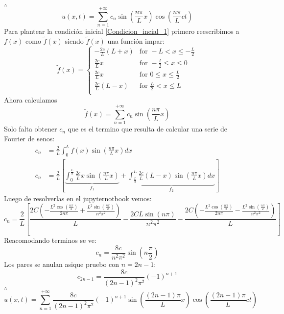 \documentclass{article}
\begin{document}
$\therefore$ 
\begin{equation*}
    u(x,t)=\sum_{n=1}^{+\infty}c_n\sin{\left(\frac{n\pi}{L}x\right)}\cos{\left(\frac{n\pi}{L}ct\right)}
\end{equation*}
Para plantear la condición inicial \eqref{Condicion_incial_1} primero reescribimos a $f(x)$ como $\widetilde{f}(x)$ siendo $\widetilde{f}(x)$ una función impar:
\begin{equation*}
    \widetilde{f}(x)=
    \begin{cases}
    -\frac{2c}{L}(L+x) & \text{for } -L < x \leq -\frac{L}{2} \\[10px]
    \frac{2c}{L}x & \text{for } -\frac{l}{2}\leq x \leq 0\\[10px]
    \frac{2c}{L}x & \text{for } 0\leq x \leq \frac{L}{2}\\[10px]
    \frac{2c}{L}(L-x) & \text{for } \frac{L}{2} < x \leq L \\
    \end{cases}
\end{equation*}
Ahora calculamos 
\begin{equation*}
    \widetilde{f}(x)=\sum_{n=1}^{+\infty}c_n\sin{\left(\frac{n\pi}{L}x\right)}
\end{equation*}
Solo falta obtener $c_n$ que es el termino que resulta de calcular una serie de Fourier de senos:
\begin{equation*}
    \begin{split}
        c_n &= \frac{2}{L}\int_{0}^L f(x)\sin{\left(\frac{n\pi}{L}x\right)} dx \\
        c_n &= \frac{2}{L}\left[\underbrace{\int_0^{\frac{L}{2}}\frac{2c}{L}x\sin{\left(\frac{n\pi}{L}x\right)}}_{f_1}+\underbrace{\int_{\frac{L}{2}}^{L} \frac{2c}{L}(L-x)\sin{\left(\frac{n\pi}{L}x\right)}dx}_{f_2} \right]
    \end{split}
\end{equation*}
Luego de resolverlas en el jupyternotbook vemos:
\begin{equation*}
    c_n = \frac{2}{L}\left[ \frac{2 C \left(- \frac{L^{2} \cos{\left(\frac{n \pi}{2} \right)}}{2 n \pi} + \frac{L^{2} \sin{\left(\frac{n \pi}{2} \right)}}{n^{2} \pi^{2}}\right)}{L}-    \frac{2 C L \sin{\left(n \pi \right)}}{n^{2} \pi^{2}} - \frac{2 C \left(- \frac{L^{2} \cos{\left(\frac{n \pi}{2} \right)}}{2 n \pi} - \frac{L^{2} \sin{\left(\frac{n \pi}{2} \right)}}{n^{2} \pi^{2}}\right)}{L} \right]
\end{equation*}
Reacomodando terminos se ve:
\begin{equation*}
    c_n = \frac{8c}{n^2\pi^2}\sin{\left(n\frac{\pi}{2}\right)}
\end{equation*}
Los pares se anulan asique pruebo con $n=2n-1$:
\begin{equation*}
    c_{2n-1} = \frac{8c}{(2n-1)^2\pi^2}(-1)^{n+1}
\end{equation*}
$\therefore$ 
\begin{equation*}
    u(x,t)=\sum_{n=1}^{+\infty}\frac{8c}{(2n-1)^2\pi^2}(-1)^{n+1}\sin{\left(\frac{(2n-1)\pi}{L}x\right)}\cos{\left(\frac{(2n-1)\pi}{L}ct\right)}
\end{equation*}
\end{document}
